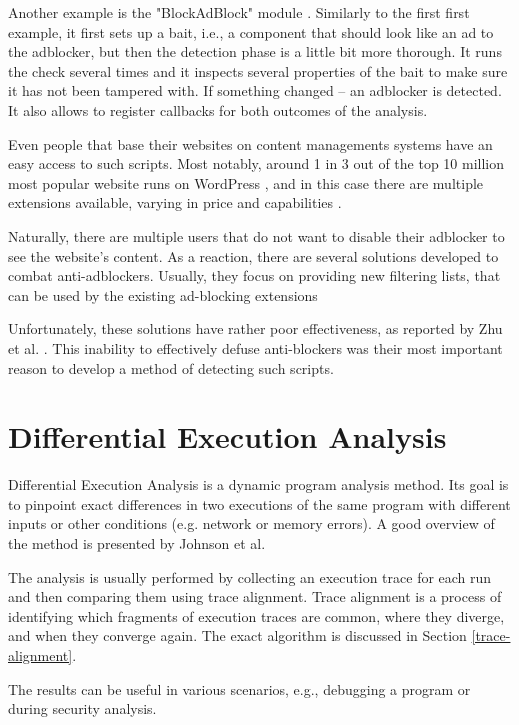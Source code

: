 Another example is the "BlockAdBlock" module \cite{github:blockadblock}.
Similarly to the first first example, it first sets up a bait,
i.e., a component that should look like an ad to the adblocker, 
but then the detection phase is a little bit more thorough. It runs the check several times
and it inspects several properties of the bait to make sure it has not been tampered with.
If something changed -- an adblocker is detected.
It also allows to register callbacks for both outcomes of the analysis.

Even people that base their websites on content managements systems have an easy access to such
scripts. Most notably, around 1 in 3 out of the top 10 million most popular website runs on WordPress \cite{wiki:wordpress},
and in this case there are multiple extensions available, varying in price and capabilities \cite{wordpress:antiadblockers}.

Naturally, there are multiple users that do not want to disable their adblocker to see the website's content.
As a reaction, there are several solutions developed to combat anti-adblockers.
Usually, they focus on providing new filtering lists, that can be used by the existing ad-blocking extensions
\cite{anti-adblock-killer, nano-defender}

Unfortunately, these solutions have rather poor effectiveness, as reported by Zhu et al. \cite{DBLP:conf/ndss/ZhuHQSY18}.
This inability to effectively defuse anti-blockers was their most important reason to develop a method of detecting such scripts.


\section{Differential Execution Analysis}

Differential Execution Analysis is a dynamic program analysis method. Its goal is to pinpoint exact differences
in two executions of the same program with different inputs or other conditions (e.g. network or memory errors).
A good overview of the method is presented by Johnson et al. \cite{ieee:alignment-and-slicing}

The analysis is usually performed by collecting an execution trace for each run and then comparing
them using trace alignment. Trace alignment is a process of identifying which fragments of execution traces
are common, where they diverge, and when they converge again. The exact algorithm is discussed in Section \ref{trace-alignment}.

The results can be useful in various scenarios, e.g., debugging a program or during security analysis.


